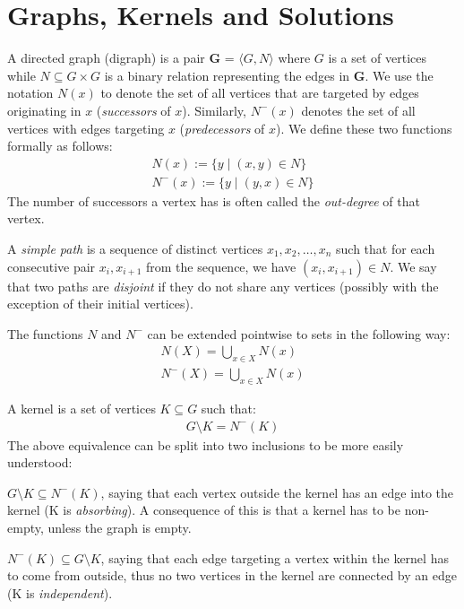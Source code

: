 \section{Graphs, Kernels and Solutions}
\label{sec:Graphs, Kernels and Solution}
A directed graph (digraph) is a pair \textbf{G} = $\langle G,N \rangle$ where $G$ is a set of vertices while $N \subseteq G \times G$ is a binary relation representing the edges in \textbf{G}.
We use the notation $N(x)$ to denote the set of all vertices that are targeted by edges originating in $x$ (\textit{successors} of $x$).
Similarly, $N^-(x)$ denotes the set of all vertices with edges targeting $x$ (\textit{predecessors} of $x$).
We define these two functions formally as follows:
\begin{align}
  N(x) := \{y \;|\; (x,y) \in N\}\\
  N^-(x) := \{ y \;|\; (y,x) \in N \}
\end{align}
The number of successors a vertex has is often called the \textit{out-degree} of that vertex.

A \textit{simple path} is a sequence of distinct vertices $x_1,x_2,\dots,x_n$ such that for each consecutive pair $x_i,x_{i+1}$ from the sequence, we have $(x_i, x_{i+1}) \in N$.
We say that two paths are \textit{disjoint} if they do not share any vertices (possibly with the exception of their initial vertices).

The functions $N$ and $N^-$ can be extended pointwise to sets in the following way:
\begin{align}
  N(X) = \bigcup_{x \in X} N(x)\\
  N^-(X) = \bigcup_{x \in X} N(x)
\end{align}

A kernel is a set of vertices $K \subseteq G$ such that:
\begin{align}
  G \setminus K = N^-(K)
\end{align}
The above equivalence can be split into two inclusions to be more easily understood:

$G \setminus K \subseteq N^-(K)$, saying that each vertex outside the kernel has an edge into the kernel (K is \textit{absorbing}).
A consequence of this is that a kernel has to be non-empty, unless the graph is empty.

$N^-(K) \subseteq G \setminus K$, saying that each edge targeting a vertex within the kernel has to come from outside, thus no two vertices in the kernel are connected by an edge (K is \textit{independent}).

